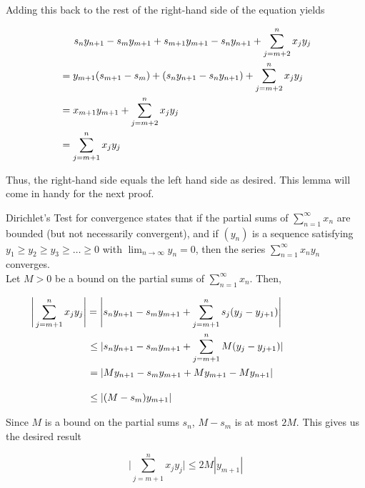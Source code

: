 \documentclass{article}
\begin{document}
Adding this back to the rest of the right-hand side of the equation yields

\begin{equation}
\begin{split}
    & \hspace{5 mm} s_n y_{n+1} - s_m y_{m+1} + s_{m+1}y_{m+1} - s_n y_{n+1} + \sum_{j=m+2}^{n} x_j y_j \\
    &= y_{m+1}(s_{m+1} - s_m) + ( s_n y_{n+1} - s_n y_{n+1}) + \sum_{j=m+2}^{n} x_j y_j \\
    &= x_{m+1} y_{m+1} + \sum_{j=m+2}^{n} x_j y_j \\
    &= \sum_{j=m+1}^{n} x_j y_j
\end{split}
\end{equation}

Thus, the right-hand side equals the left hand side as desired. This lemma will come in handy for the next proof. 
\newpage

Dirichlet's Test for convergence states that if the partial sums of $\sum_{n=1}^{\infty} x_n$ are bounded (but not necessarily convergent),
and if $(y_n)$ is a sequence satisfying $y_1 \geq y_2 \geq y_3 \geq \dots \geq 0$ with $\lim_{n\to \infty} y_n = 0$,
then the series $\sum_{n=1}^{\infty} x_n y_n$ converges. \\

Let $M > 0$ be a bound on the partial sums of $\sum_{n=1}^{\infty} x_n$. Then, 

\begin{equation}
\begin{split}
    &\hspace{-20 mm}\Bigg|\sum_{j=m+1}^{n} x_j y_j \Bigg| = \Bigg| s_n y_{n+1} - s_m y_{m+1} + \sum_{j=m+1}^{n} s_j(y_{j} - y_{j+1})\Bigg| \\
    &\leq | s_n y_{n+1} - s_m y_{m+1} + \sum_{j=m+1}^{n} M(y_{j} - y_{j+1}) | \\
    &= | M y_{n+1} - s_m y_{m+1} + M y_{m+1} - M y_{n+1} | \\[10 pt]
    &\leq | (M - s_m) y_{m+1} |
\end{split}
\end{equation}

Since $M$ is a bound on the partial sums $s_n$, $M - s_m$ is at most $2M$. This gives us the desired result

\begin{equation}
    \Bigg|\sum_{j=m+1}^{n} x_j y_j \Bigg| \leq 2M|y_{m+1}|
\end{equation}
\end{document}
